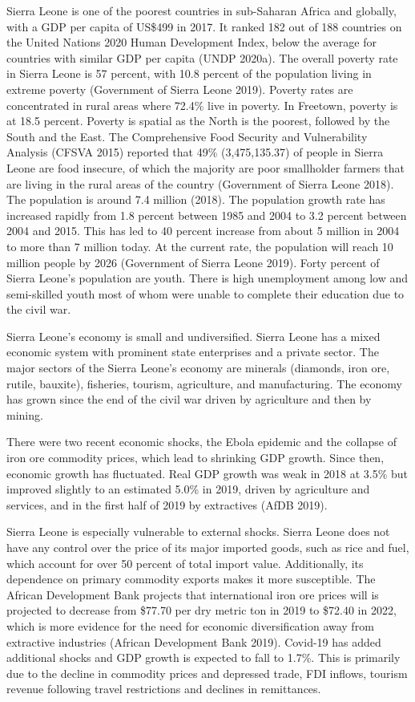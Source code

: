 \documentclass[
]{book}
\begin{document}
Sierra Leone is one of the poorest countries in sub-Saharan Africa and globally, with a GDP per capita of US\$499 in 2017. It ranked 182 out of 188 countries on the United Nations 2020 Human Development Index, below the average for countries with similar GDP per capita (UNDP 2020a). The overall poverty rate in Sierra Leone is 57 percent, with 10.8 percent of the population living in extreme poverty (Government of Sierra Leone 2019). Poverty rates are concentrated in rural areas where 72.4\% live in poverty. In Freetown, poverty is at 18.5 percent. Poverty is spatial as the North is the poorest, followed by the South and the East. The Comprehensive Food Security and Vulnerability Analysis (CFSVA 2015) reported that 49\% (3,475,135.37) of people in Sierra Leone are food insecure, of which the majority are poor smallholder farmers that are living in the rural areas of the country (Government of Sierra Leone 2018).\\
The population is around 7.4 million (2018). The population growth rate has increased rapidly from 1.8 percent between 1985 and 2004 to 3.2 percent between 2004 and 2015. This has led to 40 percent increase from about 5 million in 2004 to more than 7 million today. At the current rate, the population will reach 10 million people by 2026 (Government of Sierra Leone 2019). Forty percent of Sierra Leone's population are youth. There is high unemployment among low and semi-skilled youth most of whom were unable to complete their education due to the civil war.

Sierra Leone's economy is small and undiversified. Sierra Leone has a mixed economic system with prominent state enterprises and a private sector. The major sectors of the Sierra Leone's economy are minerals (diamonds, iron ore, rutile, bauxite), fisheries, tourism, agriculture, and manufacturing. The economy has grown since the end of the civil war driven by agriculture and then by mining.

There were two recent economic shocks, the Ebola epidemic and the collapse of iron ore commodity prices, which lead to shrinking GDP growth. Since then, economic growth has fluctuated. Real GDP growth was weak in 2018 at 3.5\% but improved slightly to an estimated 5.0\% in 2019, driven by agriculture and services, and in the first half of 2019 by extractives (AfDB 2019).

Sierra Leone is especially vulnerable to external shocks. Sierra Leone does not have any control over the price of its major imported goods, such as rice and fuel, which account for over 50 percent of total import value. Additionally, its dependence on primary commodity exports makes it more susceptible. The African Development Bank projects that international iron ore prices will is projected to decrease from \$77.70 per dry metric ton in 2019 to \$72.40 in 2022, which is more evidence for the need for economic diversification away from extractive industries (African Development Bank 2019). Covid-19 has added additional shocks and GDP growth is expected to fall to 1.7\%. This is primarily due to the decline in commodity prices and depressed trade, FDI inflows, tourism revenue following travel restrictions and declines in remittances.
\end{document}
